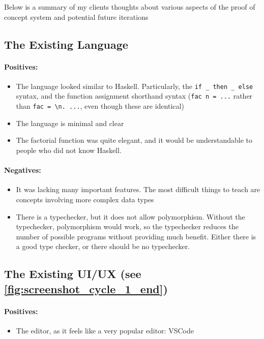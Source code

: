 Below is a summary of my clients thoughts about various aspects of the proof of concept system and potential future iterations

\subsection{The Existing Language}
\paragraph{Positives:}
\begin{itemize}
    \item The language looked similar to Haskell. Particularly, the \verb|if _ then _ else| syntax, and the function assignment shorthand syntax (\verb|fac n = ...| rather than \verb|fac = \n. ...|, even though these are identical)
    \item The language is minimal and clear
    \item The factorial function was quite elegant, and it would be understandable to people who did not know Haskell.  
\end{itemize}

\paragraph{Negatives:}
\begin{itemize}
    \item It was lacking many important features. The most difficult things to teach are concepts involving more complex data types
    \item There is a typechecker, but it does not allow polymorphism. Without the typechecker, polymorphism would work, so the typechecker reduces the number of possible programs without providing much benefit. Either there is a good type checker, or there should be no typechecker. 
\end{itemize}

\subsection{The Existing UI/UX (see \ref{fig:screenshot_cycle_1_end})}
\paragraph{Positives:}
\begin{itemize}
    \item The editor, as it feels like a very popular editor: VSCode
\end{itemize}

